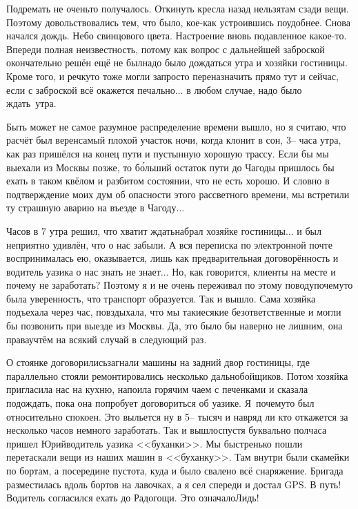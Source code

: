 Подремать не очень\sdash то получалось. Откинуть кресла назад нельзя\mdash там сзади вещи. Поэтому довольствовались тем, что было, кое-как устроившись поудобнее. Снова начался дождь. Небо свинцового цвета. Настроение вновь подавленное какое-то. Впереди полная неизвестность, потому как вопрос с дальнейшей заброской окончательно решён ещё не был\mdash надо было дождаться утра и хозяйки гостиницы. Кроме того, и речку\sdash то тоже могли запросто переназначить прямо тут и сейчас, если с заброской всё окажется печально$\ldots$ в любом случае, надо было ждать~утра. 

Быть может не самое разумное распределение времени вышло, но я считаю, что расчёт был верен\mdash самый плохой участок ночи, когда клонит в сон, 3\thinspace\nobreakdash-- часа утра, как раз пришёлся на конец пути и пустынную хорошую трассу. Если бы мы выехали из Москвы позже, то б\'{о}льший остаток пути до Чагоды пришлось бы ехать в таком квёлом и разбитом состоянии, что не есть хорошо. И словно в подтверждение моих дум об опасности этого рассветного времени, мы встретили ту страшную аварию на въезде в Чагоду$\ldots$

Часов в 7 утра решил, что хватит ждать\mdash набрал хозяйке гостиницы$\ldots$ и был неприятно удивлён, что о нас забыли. А вся переписка по электронной почте воспринималась ею, оказывается, лишь как предварительная договорённость и водитель уазика о нас знать не знает$\ldots$ Но, как говорится, клиенты на месте и почему не заработать? Поэтому я и не очень переживал по этому поводу\mdash почему\sdash то была уверенность, что транспорт образуется. Так и вышло. Сама хозяйка подъехала через час, повздыхала, что мы такие\sdash сякие безответственные и могли бы позвонить при выезде из Москвы. Да, это было бы наверно не лишним, она права\mdash учтём на всякий случай в следующий раз. 

О стоянке договорились\mdash загнали машины на задний двор гостиницы, где параллельно стояли ремонтировались несколько дальнобойщиков. Потом хозяйка пригласила нас на кухню, напоила горячим чаем с печенками и сказала подождать, пока она попробует договориться об уазике. Я~почему\sdash то был относительно спокоен. Это выльется ну в 5\thinspace\nobreakdash-- тысяч и навряд ли кто откажется за несколько часов немного заработать. Так и вышло\mdash спустя буквально полчаса пришел Юрий\mdash водитель уазика <<буханки>>. Мы быстренько пошли перетаскали вещи из наших машин в <<буханку>>. Там внутри были скамейки по бортам, а посередине пустота, куда и было свалено всё снаряжение. Бригада разместилась вдоль бортов на лавочках, а я сел спереди и достал GPS. В путь! Водитель согласился ехать до Радогощи. Это означало\mdash Лидь!

